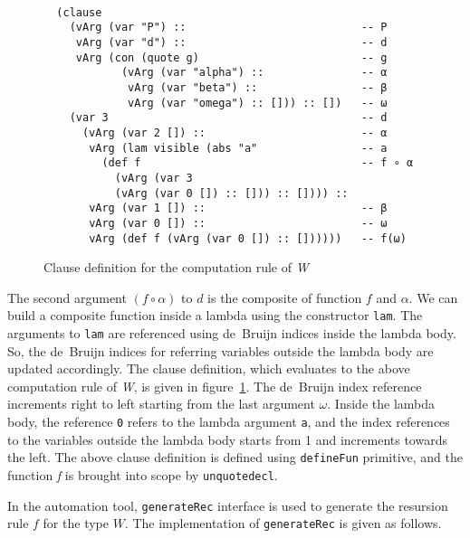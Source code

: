 \documentclass[sigplan,10pt]{acmart}
\begin{document}
\begin{figure}
\begin{center}
\begingroup
\fontsize{7pt}{9pt}\selectfont
\begin{Verbatim}[frame = single]

  (clause 
    (vArg (var "P") ::                           -- P
     vArg (var "d") ::                           -- d
     vArg (con (quote g)                         -- g
            (vArg (var "alpha") ::               -- α
             vArg (var "beta") ::                -- β
             vArg (var "omega") :: [])) :: [])   -- ω
    (var 3                                       -- d
      (vArg (var 2 []) ::                        -- α
       vArg (lam visible (abs "a"                -- a
         (def f                                  -- f ∘ α
           (vArg (var 3                     
           (vArg (var 0 []) :: [])) :: []))) ::
       vArg (var 1 []) ::                        -- β
       vArg (var 0 []) ::                        -- ω
       vArg (def f (vArg (var 0 []) :: [])))))   -- f(ω)

\end{Verbatim}
\endgroup
\end{center}
\caption{Clause definition for the computation rule of \emph{W}}
\label{fig:ast-cdef}
\end{figure}

\normalsize

The second argument $(f \circ \alpha)$ to $d$ is the composite of function $f$ and $\alpha$. We can build a composite function inside a lambda using the constructor {\tt lam}. The arguments to {\tt lam} are referenced using de~Bruijn indices inside the lambda body. So, the de~Bruijn indices for referring variables outside the lambda body are updated accordingly. The clause definition, which evaluates to the above computation rule of \emph{W}, is given in figure~\ref{fig:ast-cdef}. The de~Bruijn index reference increments right to left starting from the last argument $\omega$. Inside the lambda body, the reference {\tt 0} refers to the lambda argument {\tt a}, and the index references to the variables outside the lambda body starts from 1 and increments towards the left. The above clause definition is defined using {\tt defineFun} primitive, and the function \emph{f} is brought into scope by {\tt unquotedecl}. 

In the automation tool, {\tt generateRec} interface is used to generate the resursion rule $f$ for the type $W$. The implementation of {\tt generateRec} is given as follows.
\end{document}
